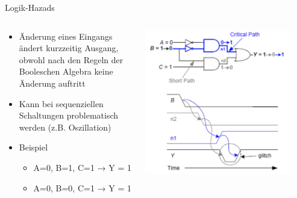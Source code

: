 \documentclass[
  german,            %
  aspectratio=169,    %
]{tumbeamer}
\begin{document}
\begin{frame}[fragile, c]{Logik-Hazads}{}
	\begin{columns}[c]
	\begin{column}{0.5\textwidth}
		\begin{itemize}
			\item Änderung eines Eingangs ändert kurzzeitig Ausgang, obwohl nach den Regeln der	Booleschen Algebra keine Änderung auftritt
			\item Kann bei sequenziellen Schaltungen problematisch werden (z.B. Oszillation)
			\item Beispiel
			\begin{itemize}
				\item A=0, B=1, C=1 → Y = 1
				\item A=0, B=0, C=1 → Y = 1
			\end{itemize} 
		\end{itemize}
	\end{column}
	\begin{column}{0.5\textwidth}
	\begin{center}
	\includegraphics[width=0.9\textwidth]{w12_logik_hazard.png}
	\end{center}
	\end{column}
	\end{columns}
	
	\end{frame}
\end{document}
